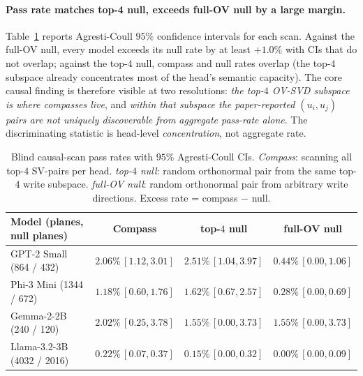 \paragraph{Pass rate matches top-4 null, exceeds full-OV null by a
large margin.} Table~\ref{tab:scan} reports Agresti-Coull $95\%$
confidence intervals for each scan. Against the full-OV null, every
model exceeds its null rate by at least $+1.0\%$ with CIs that do not
overlap; against the top-$4$ null, compass and null rates overlap (the
top-$4$ subspace already concentrates most of the head's semantic
capacity). The core causal finding is therefore visible at two
resolutions: \emph{the top-$4$ OV-SVD subspace is where compasses
live}, and \emph{within that subspace the paper-reported $(u_i, u_j)$
pairs are not uniquely discoverable from aggregate pass-rate alone}.
The discriminating statistic is head-level \emph{concentration}, not
aggregate rate.

\begin{table}[h]
\centering
\small
\caption{Blind causal-scan pass rates with $95\%$ Agresti-Coull CIs.
\emph{Compass}: scanning all top-$4$ SV-pairs per head.
\emph{top-$4$ null}: random orthonormal pair from the same top-$4$
write subspace. \emph{full-OV null}: random orthonormal pair from
arbitrary write directions. Excess rate = compass $-$ null.}
\label{tab:scan}
\begin{tabular}{lccc}
\toprule
Model (planes, null planes) & Compass & top-$4$ null & full-OV null \\
\midrule
GPT-2 Small (864 / 432)       & $2.06\%\,[1.12,3.01]$ & $2.51\%\,[1.04,3.97]$ & $0.44\%\,[0.00,1.06]$ \\
Phi-3 Mini (1344 / 672)       & $1.18\%\,[0.60,1.76]$ & $1.62\%\,[0.67,2.57]$ & $0.28\%\,[0.00,0.69]$ \\
Gemma-2-2B (240 / 120)        & $2.02\%\,[0.25,3.78]$ & $1.55\%\,[0.00,3.73]$ & $1.55\%\,[0.00,3.73]$ \\
Llama-3.2-3B (4032 / 2016)    & $0.22\%\,[0.07,0.37]$ & $0.15\%\,[0.00,0.32]$ & $0.00\%\,[0.00,0.09]$ \\
\bottomrule
\end{tabular}
\end{table}

